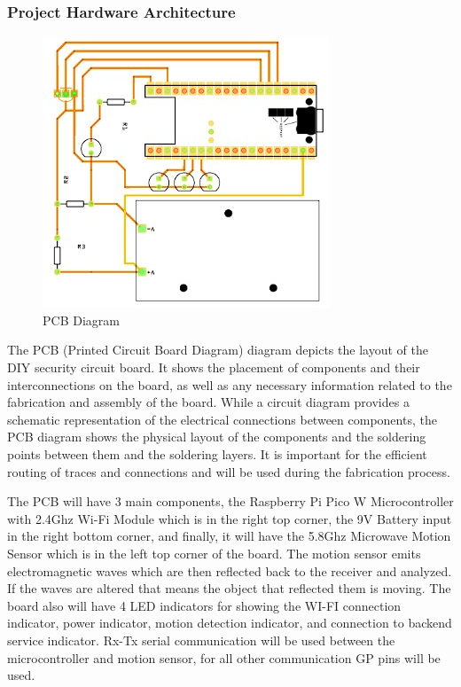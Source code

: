 \documentclass[conference]{IEEEtran}
\begin{document}
\subsubsection{Project Hardware Architecture}

\begin{figure}[htbp]
      \centering
      \includegraphics[width=0.8\linewidth]{pcbDiagram.jpg}
      \caption{PCB Diagram}
      \label{fig:pcbDiagram}
\end{figure}

The PCB (Printed Circuit Board Diagram) diagram depicts the layout of the DIY security
circuit board. It shows the placement of components and their interconnections on the
board, as well as any necessary information related to the fabrication and assembly of
the board. While a circuit diagram provides a schematic representation of the electrical
connections between components, the PCB diagram shows the physical layout of the
components and the soldering points between them and the soldering layers. It is
important for the efficient routing of traces and connections and will be used during
the fabrication process.

The PCB will have 3 main components, the Raspberry Pi Pico W Microcontroller with
2.4Ghz Wi-Fi Module which is in the right top corner, the 9V Battery input in the
right bottom corner, and finally, it will have the 5.8Ghz Microwave Motion Sensor
which is in the left top corner of the board. The motion sensor emits electromagnetic
waves which are then reflected back to the receiver and analyzed. If the waves are
altered that means the object that reflected them is moving. The board also will have
4 LED indicators for showing the WI-FI connection indicator, power indicator,
motion detection indicator, and connection to backend service indicator.
Rx-Tx serial communication will be used between the microcontroller and motion sensor,
for all other communication GP pins will be used.
\end{document}
